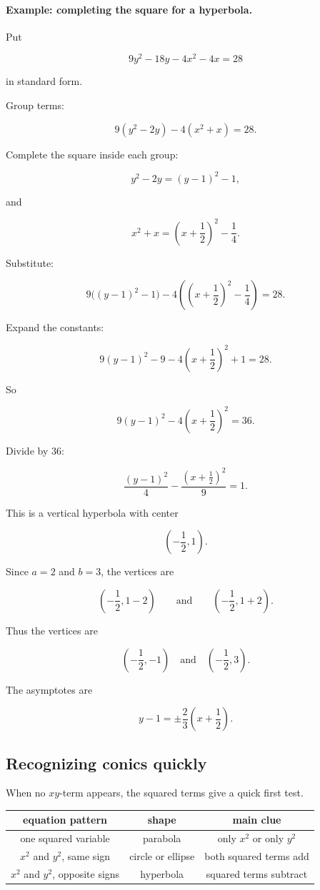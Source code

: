 \paragraph{Example: completing the square for a hyperbola.}
Put

\[
9y^2-18y-4x^2-4x=28
\]

in standard form.

Group terms:

\[
9(y^2-2y)-4(x^2+x)=28.
\]

Complete the square inside each group:

\[
y^2-2y=(y-1)^2-1,
\]

and

\[
x^2+x=\left(x+\frac12\right)^2-\frac14.
\]

Substitute:

\[
9\bigl((y-1)^2-1\bigr)
-
4\left(\left(x+\frac12\right)^2-\frac14\right)
=
28.
\]

Expand the constants:

\[
9(y-1)^2-9
-
4\left(x+\frac12\right)^2
+1
=
28.
\]

So

\[
9(y-1)^2-4\left(x+\frac12\right)^2=36.
\]

Divide by \(36\):

\[
\boxed{
\frac{(y-1)^2}{4}
-
\frac{\left(x+\frac12\right)^2}{9}
=
1.
}
\]

This is a vertical hyperbola with center

\[
\boxed{
\left(-\frac12,1\right).
}
\]

Since \(a=2\) and \(b=3\), the vertices are

\[
\left(-\frac12,1-2\right)
\qquad\text{and}\qquad
\left(-\frac12,1+2\right).
\]

Thus the vertices are

\[
\boxed{
\left(-\frac12,-1\right)
\quad\text{and}\quad
\left(-\frac12,3\right).
}
\]

The asymptotes are

\[
\boxed{
y-1=\pm\frac23\left(x+\frac12\right).
}
\]

\subsection{Recognizing conics quickly}
\label{appsubsec:recognizing-conics}

When no \(xy\)-term appears, the squared terms give a quick first test.

\begin{center}
\renewcommand{\arraystretch}{1.6}
\begin{tabular}{c|c|c}
\textbf{equation pattern} & \textbf{shape} & \textbf{main clue} \\ \hline
one squared variable & parabola & only \(x^2\) or only \(y^2\) \\
\(x^2\) and \(y^2\), same sign & circle or ellipse & both squared terms add \\
\(x^2\) and \(y^2\), opposite signs & hyperbola & squared terms subtract
\end{tabular}
\end{center}

